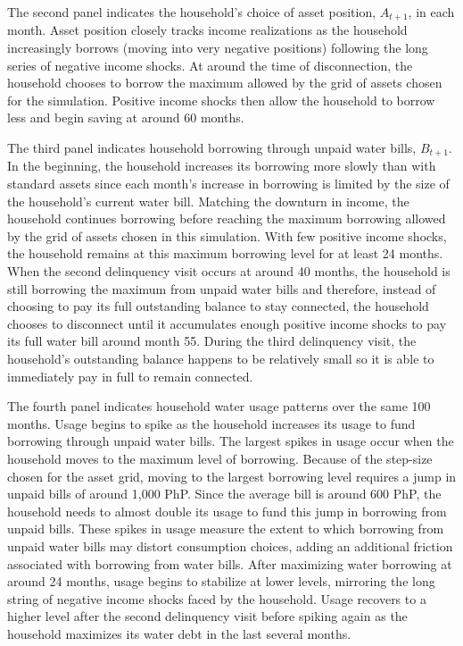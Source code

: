 \documentclass[12pt]{article}
\begin{document}
The second panel indicates the household's choice of asset position, $A_{t+1}$, in each month.  Asset position closely tracks income realizations as the household increasingly borrows (moving into very negative positions) following the long series of negative income shocks.  At around the time of disconnection, the household chooses to borrow the maximum allowed by the grid of assets chosen for the simulation.  Positive income shocks then allow the household to borrow less and begin saving at around 60 months.

The third panel indicates household borrowing through unpaid water bills, $B_{t+1}$.  In the beginning, the household increases its borrowing more slowly than with standard assets since each month's increase in borrowing is limited by the size of the household's current water bill.  Matching the downturn in income, the household continues borrowing before reaching the maximum borrowing allowed by the grid of assets chosen in this simulation.  With few positive income shocks, the household remains at this maximum borrowing level for at least 24 months.  When the second delinquency visit occurs at around 40 months, the household is still borrowing the maximum from unpaid water bills and therefore, instead of choosing to pay its full outstanding balance to stay connected, the household chooses to disconnect until it accumulates enough positive income shocks to pay its full water bill around month 55.  During the third delinquency visit, the household's outstanding balance happens to be relatively small so it is able to immediately pay in full to remain connected.

The fourth panel indicates household water usage patterns over the same 100 months.  Usage begins to spike as the household increases its usage to fund borrowing through unpaid water bills.  The largest spikes in usage occur when the household moves to the maximum level of borrowing.  Because of the step-size chosen for the asset grid, moving to the largest borrowing level requires a jump in unpaid bills of around 1,000 PhP.  Since the average bill is around 600 PhP, the household needs to almost double its usage to fund this jump in borrowing from unpaid bills.  These spikes in usage measure the extent to which borrowing from unpaid water bills may distort consumption choices, adding an additional friction associated with borrowing from water bills.  After maximizing water borrowing at around 24 months, usage begins to stabilize at lower levels, mirroring the long string of negative income shocks faced by the household.  Usage recovers to a higher level after the second delinquency visit before spiking again as the household maximizes its water debt in the last several months.
\end{document}
